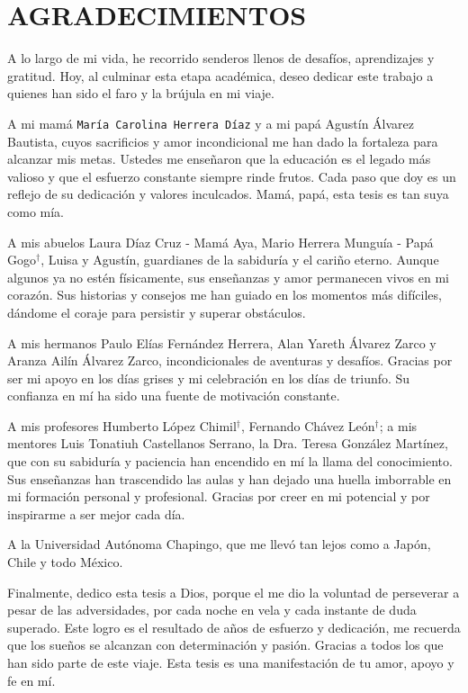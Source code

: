 \chapter*{AGRADECIMIENTOS}
A lo largo de mi vida, he recorrido senderos llenos de desafíos, aprendizajes y gratitud. Hoy, al culminar esta etapa académica, deseo dedicar este trabajo a quienes han sido el faro y la brújula en mi viaje.

A mi mamá \texttt{María Carolina Herrera Díaz} y a mi papá Agustín Álvarez Bautista, cuyos sacrificios y amor incondicional me han dado la fortaleza para alcanzar mis metas. Ustedes me enseñaron que la educación es el legado más valioso y que el esfuerzo constante siempre rinde frutos. Cada paso que doy es un reflejo de su dedicación y valores inculcados. Mamá, papá, esta tesis es tan suya como mía.

A mis abuelos Laura Díaz Cruz - Mamá Aya, Mario Herrera Munguía - Papá Gogo$^\dag$, Luisa y Agustín, guardianes de la sabiduría y el cariño eterno. Aunque algunos ya no estén físicamente, sus enseñanzas y amor permanecen vivos en mi corazón. Sus historias y consejos me han guiado en los momentos más difíciles, dándome el coraje para persistir y superar obstáculos.

A mis hermanos Paulo Elías Fernández Herrera, Alan Yareth Álvarez Zarco y Aranza Ailín Álvarez Zarco, incondicionales de aventuras y desafíos. Gracias por ser mi apoyo en los días grises y mi celebración en los días de triunfo. Su confianza en mí ha sido una fuente de motivación constante.

A mis profesores Humberto López Chimil$^\dag$, Fernando Chávez León$^\dag$; a mis mentores Luis Tonatiuh Castellanos Serrano, la Dra. Teresa González Martínez, que con su sabiduría y paciencia han encendido en mí la llama del conocimiento. Sus enseñanzas han trascendido las aulas y han dejado una huella imborrable en mi formación personal y profesional. Gracias por creer en mi potencial y por inspirarme a ser mejor cada día.

A la Universidad Autónoma Chapingo, que me llevó tan lejos como a Japón, Chile y todo México.

Finalmente, dedico esta tesis a Dios, porque el me dio la voluntad de perseverar a pesar de las adversidades, por cada noche en vela y cada instante de duda superado. Este logro es el resultado de años de esfuerzo y dedicación, me recuerda que los sueños se alcanzan con determinación y pasión. Gracias a todos los que han sido parte de este viaje. Esta tesis es una manifestación de tu amor, apoyo y fe en mí.
